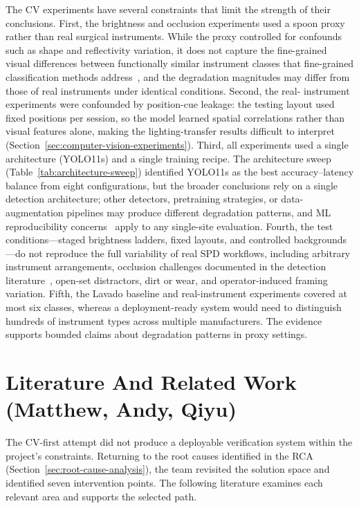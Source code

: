 \documentclass[10pt,a4paper]{article}
\begin{document}
The CV experiments have several constraints that limit the strength of
their conclusions. First, the brightness and occlusion experiments used a
spoon proxy rather than real surgical instruments. While the proxy
controlled for confounds such as shape and reflectivity variation, it does
not capture the fine-grained visual differences between functionally
similar instrument classes that fine-grained classification methods
address~\cite{wang-et-al-2021, zhao-et-al-2017, seeland-and-mader-2021},
and the degradation magnitudes may differ from
those of real instruments under identical conditions. Second, the real-
instrument experiments were confounded by position-cue leakage: the
testing layout used fixed positions per session, so the model learned
spatial correlations rather than visual features alone, making the
lighting-transfer results difficult to interpret (Section~\ref{sec:computer-vision-experiments}).
Third, all experiments used a single architecture (YOLO11s) and a single
training recipe. The architecture sweep
(Table~\ref{tab:architecture-sweep}) identified YOLO11s as the best
accuracy--latency balance from eight configurations, but the broader
conclusions rely on a single detection architecture; other detectors,
pretraining strategies, or data-augmentation pipelines may produce
different degradation patterns, and ML
reproducibility concerns~\cite{heil-et-al-2021, tikhomirov-et-al-2026}
apply to any single-site evaluation. Fourth,
the test conditions---staged brightness ladders, fixed layouts, and
controlled backgrounds---do not reproduce the full variability of real SPD
workflows, including arbitrary instrument arrangements, occlusion challenges
documented in the detection literature~\cite{ning-et-al-2021}, open-set
distractors, dirt or wear, and operator-induced framing variation. Fifth,
the Lavado baseline and real-instrument experiments covered at most six
classes, whereas a deployment-ready system would need to distinguish
hundreds of instrument types across multiple manufacturers. The evidence supports bounded claims about
degradation patterns in proxy settings.


\section{Literature And Related Work \hfill {\normalfont\small (Matthew, Andy, Qiyu)}}
\label{sec:literature-and-related-work}
\label{sec:reason-for-pivot}

The CV-first attempt did not produce a deployable verification system within the project's constraints. Returning to the root causes identified in the RCA (Section~\ref{sec:root-cause-analysis}), the team revisited the solution space and identified seven intervention points. The following literature examines each relevant area and supports the selected path.
\end{document}
